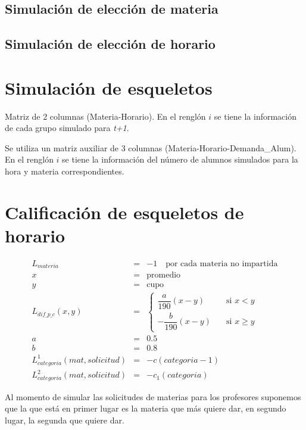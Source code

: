 \subsection{Simulación de elección de materia}

\subsection{Simulación de elección de horario}



\section{Simulación de esqueletos}

Matriz de 2 columnas (Materia-Horario). En el renglón $i$ se tiene la información de cada grupo simulado para \textit{t+1}.

Se utiliza un matriz auxiliar de 3 columnas (Materia-Horario-Demanda\_Alum). En el renglón $i$ se tiene la información del número de alumnos simulados para la hora y materia correspondientes.




\section{Calificación de esqueletos de horario}

\begin{eqnarray*}
L_{materia} &=& -1 \,\,\,\,\,\,  \text{por cada materia no impartida}\\
x &=& \text{promedio}\\
y &=& \text{cupo}\\
L_{dif\_p\_c} (x,y) &=& \begin{cases}
    \dfrac{a}{190} (x-y)  & \quad \text{si } x<y\\
    - \dfrac{b}{190} (x-y)  & \quad \text{si } x\geqslant y
  \end{cases}\\
a &=& 0.5\\
b &=& 0.8\\
L_{categoria}^{1} (mat,solicitud) &=& -c(categoria - 1)\\
L_{categoria}^{2} (mat,solicitud) &=& -c_{1}(categoria)
\end{eqnarray*}

Al momento de simular las solicitudes de materias para los profesores suponemos que la que está en primer lugar es la materia que más quiere dar, en segundo lugar, la segunda que quiere dar.

